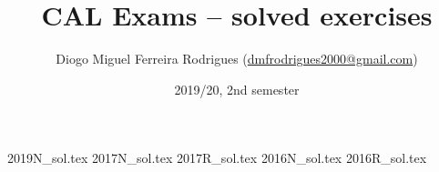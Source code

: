 \documentclass{cal}
\title{CAL Exams -- solved exercises}
\author{Diogo Miguel Ferreira Rodrigues (\href{mailto:dmfrodrigues2000@gmail.com}{dmfrodrigues2000@gmail.com})}
\date{2019/20, 2nd semester}
\begin{document}
\frontmatter
\begingroup
\maketitle
    \let\clearpage\relax
	\tableofcontents
\endgroup
\mainmatter
{2019N_sol.tex}
{2017N_sol.tex}
{2017R_sol.tex}
{2016N_sol.tex}
{2016R_sol.tex}
\end{document}
